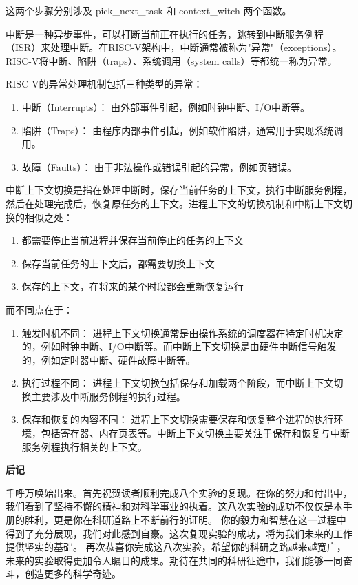 \documentclass[lang=cn,10pt]{elegantbook}
\begin{document}
这两个步骤分别涉及 pick\_next\_task 和 context\_witch 两个函数。

中断是一种异步事件，可以打断当前正在执行的任务，跳转到中断服务例程（ISR）来处理中断。在RISC-V架构中，中断通常被称为"异常"（exceptions）。RISC-V将中断、陷阱（traps）、系统调用（system calls）等都统一称为异常。

RISC-V的异常处理机制包括三种类型的异常：
\begin{enumerate}
\item 中断（Interrupts）： 由外部事件引起，例如时钟中断、I/O中断等。
\item 陷阱（Traps）： 由程序内部事件引起，例如软件陷阱，通常用于实现系统调用。
\item 故障（Faults）： 由于非法操作或错误引起的异常，例如页错误。
\end{enumerate}

中断上下文切换是指在处理中断时，保存当前任务的上下文，执行中断服务例程，然后在处理完成后，恢复原任务的上下文。进程上下文的切换机制和中断上下文切换的相似之处：
\begin{enumerate}
  \item 都需要停止当前进程并保存当前停止的任务的上下文
  \item 保存当前任务的上下文后，都需要切换上下文
  \item 保存的上下文，在将来的某个时段都会重新恢复运行
\end{enumerate}

而不同点在于：

\begin{enumerate}
\item 触发时机不同： 进程上下文切换通常是由操作系统的调度器在特定时机决定的，例如时钟中断、I/O中断等。而中断上下文切换是由硬件中断信号触发的，例如定时器中断、硬件故障中断等。
\item 执行过程不同： 进程上下文切换包括保存和加载两个阶段，而中断上下文切换主要涉及中断服务例程的执行过程。
\item 保存和恢复的内容不同： 进程上下文切换需要保存和恢复整个进程的执行环境，包括寄存器、内存页表等。中断上下文切换主要关注于保存和恢复与中断服务例程执行相关的上下文。
\end{enumerate}


\newpage
\thispagestyle{empty} 
\begin{center}
  \textbf{\large 后记}
\end{center}

千呼万唤始出来。首先祝贺读者顺利完成八个实验的复现。在你的努力和付出中，我们看到了坚持不懈的精神和对科学事业的执着。这八次实验的成功不仅仅是本手册的胜利，更是你在科研道路上不断前行的证明。
你的毅力和智慧在这一过程中得到了充分展现，我们对此感到自豪。这次复现实验的成功，将为我们未来的工作提供坚实的基础。
再次恭喜你完成这八次实验，希望你的科研之路越来越宽广，未来的实验取得更加令人瞩目的成果。期待在共同的科研征途中，我们能够一同奋斗，创造更多的科学奇迹。
\end{document}
